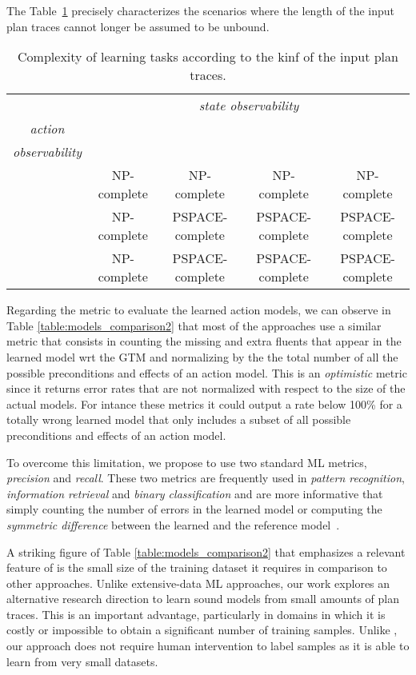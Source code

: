 The Table~\ref{tab:complex} precisely characterizes the scenarios where the length of the input plan traces cannot longer be assumed to be unbound.
\begin{table}[ht]
\centering
\begin{tabular}{c|c|c|c|c|}
	& \multicolumn{4}{c|}{\emph{state observability}} \\ \cline{2-5}
	\multirow{1}{*}{\emph{action}} & \FO & \PO & \POstar & \NO\\ {\emph{observability}} & & & & \\ \hline
	\FO & NP-complete & NP-complete & NP-complete & NP-complete \\ \hline
	\PO & NP-complete & PSPACE-complete & PSPACE-complete & PSPACE-complete \\ \hline
	\NO & NP-complete & PSPACE-complete & PSPACE-complete & PSPACE-complete\\ \hline
\end{tabular}
\caption{Complexity of learning tasks according to the kinf of the input plan traces.}
\label{tab:complex}
\end{table}



    
Regarding the metric to evaluate the learned action models, we can observe in Table \ref{table:models_comparison2} that most of the approaches use a similar metric that consists in counting the missing and extra fluents that appear in the learned model wrt the GTM and normalizing by the the total number of all the possible preconditions and effects of an action model. This is an {\em optimistic} metric since it returns error rates that are not normalized with respect to the size of the actual models. For intance these metrics it could output a rate below 100\% for a totally wrong learned model that only includes a subset of all possible preconditions and effects of an action model.

To overcome this limitation, we propose to use two standard ML metrics, {\em precision} and {\em recall}. These two metrics are frequently used in {\em pattern recognition}, {\em information retrieval} and {\em binary classification} and are more informative that simply counting the number of errors in the learned model or computing the {\em symmetric difference} between the learned and the reference model~\cite{davis2006relationship}.

A striking figure of Table \ref{table:models_comparison2} that emphasizes a relevant feature of \FAMA is the small size of the training dataset it requires in comparison to other approaches. Unlike extensive-data ML approaches, our work explores an alternative research direction to learn sound models from small amounts of plan traces. This is an important advantage, particularly in domains in which it is costly or impossible to obtain a significant number of training samples. Unlike \CAMA, our approach does not require human intervention to label samples as it is able to learn from very small datasets.

